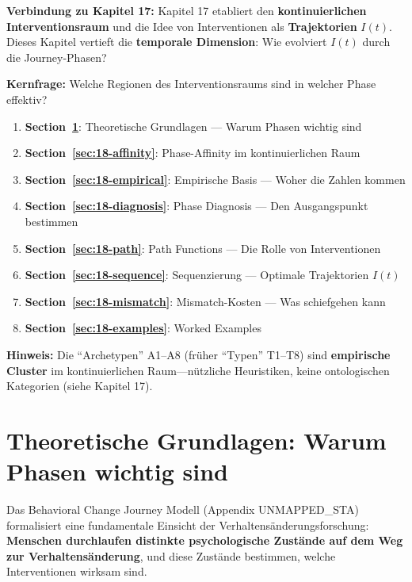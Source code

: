 \begin{tcolorbox}[colback=green!5!white, colframe=green!75!black,
    title=Chapter Overview]

\textbf{Verbindung zu Kapitel 17:} Kapitel 17 etabliert den \textbf{kontinuierlichen Interventionsraum} und die Idee von Interventionen als \textbf{Trajektorien} $I(t)$. Dieses Kapitel vertieft die \textbf{temporale Dimension}: Wie evolviert $I(t)$ durch die Journey-Phasen?

\textbf{Kernfrage:} Welche Regionen des Interventionsraums sind in welcher Phase effektiv?

\begin{enumerate}
\item \textbf{Section~\ref{sec:18-theory}}: Theoretische Grundlagen --- Warum Phasen wichtig sind
\item \textbf{Section~\ref{sec:18-affinity}}: Phase-Affinity im kontinuierlichen Raum
\item \textbf{Section~\ref{sec:18-empirical}}: Empirische Basis --- Woher die Zahlen kommen
\item \textbf{Section~\ref{sec:18-diagnosis}}: Phase Diagnosis --- Den Ausgangspunkt bestimmen
\item \textbf{Section~\ref{sec:18-path}}: Path Functions --- Die Rolle von Interventionen
\item \textbf{Section~\ref{sec:18-sequence}}: Sequenzierung --- Optimale Trajektorien $I(t)$
\item \textbf{Section~\ref{sec:18-mismatch}}: Mismatch-Kosten --- Was schiefgehen kann
\item \textbf{Section~\ref{sec:18-examples}}: Worked Examples
\end{enumerate}

\textbf{Hinweis:} Die ``Archetypen'' A1--A8 (fr\"{u}her ``Typen'' T1--T8) sind \textbf{empirische Cluster} im kontinuierlichen Raum---n\"{u}tzliche Heuristiken, keine ontologischen Kategorien (siehe Kapitel 17).
\end{tcolorbox}


\section{Theoretische Grundlagen: Warum Phasen wichtig sind}
\label{sec:18-theory}

Das Behavioral Change Journey Modell (Appendix UNMAPPED_STA) formalisiert eine fundamentale Einsicht der Verhaltensänderungsforschung: \textbf{Menschen durchlaufen distinkte psychologische Zustände auf dem Weg zur Verhaltensänderung}, und diese Zustände bestimmen, welche Interventionen wirksam sind.

